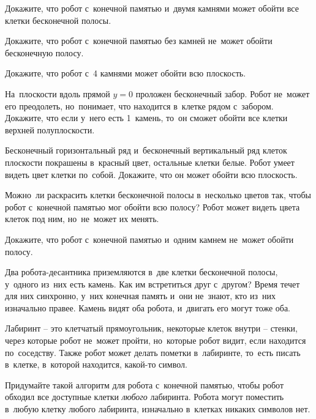 


\begin{problems}

Докажите, что робот с~конечной памятью и~двумя камнями может обойти все клетки
бесконечной полосы.

Докажите, что робот с~конечной памятью без камней не~может обойти бесконечную
полосу.

\item
Докажите, что робот с~4 камнями может обойти всю плоскость.

\item
На~плоскости вдоль прямой $y = 0$ проложен бесконечный забор.
Робот не~может его преодолеть, но~понимает, что находится в~клетке рядом
с~забором.
Докажите, что если у~него есть 1~камень, то~он сможет обойти все клетки верхней
полуплоскости.

\item
Бесконечный горизонтальный ряд и~бесконечный вертикальный ряд клеток плоскости
покрашены в~красный цвет, остальные клетки белые.
Робот умеет видеть цвет клетки по~собой.
Докажите, что он может обойти всю плоскость.

\item
Можно~ли раскрасить клетки бесконечной полосы в~несколько цветов так, чтобы
робот с~конечной памятью мог обойти всю полосу?
Робот может видеть цвета клеток под ним, но~не~может их менять.

\item
Докажите, что робот с~конечной памятью и~одним камнем не~может обойти полосу.

\item
Два робота-десантника приземляются в~две клетки бесконечной полосы, у~одного
из~них есть камень.
Как им встретиться друг с~другом?
Время течет для них синхронно, у~них конечная память и~они не~знают, кто из~них
изначально правее.
Камень видят оба робота, и~двигать его могут тоже оба.

\item
Лабиринт -- это клетчатый прямоугольник, некоторые клеток внутри -- стенки,
через которые робот не~может пройти, но~которые робот видит, если находится
по~соседству.
Также робот может делать пометки в~лабиринте, то~есть писать в~клетке,
в~которой находится, какой-то символ.
\par
Придумайте такой алгоритм для робота с~конечной памятью, чтобы робот обходил
все доступные клетки \emph{любого} лабиринта.
Робота могут поместить в~любую клетку любого лабиринта, изначально в~клетках
никаких символов нет.


\end{problems}

